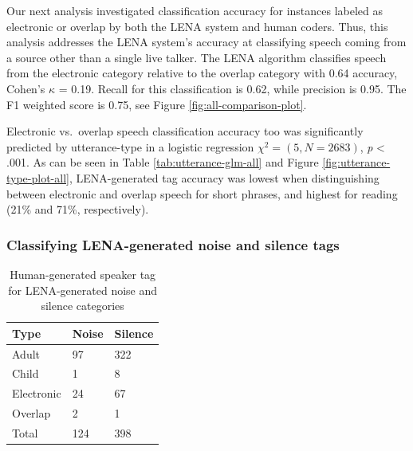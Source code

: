 \documentclass[man,floatsintext]{apa6}
\theoremstyle{definition}
\theoremstyle{definition}
\theoremstyle{definition}
\theoremstyle{remark}
\begin{document}
Our next analysis investigated classification accuracy for instances
labeled as electronic or overlap by both the LENA system and human
coders. Thus, this analysis addresses the LENA system's accuracy at
classifying speech coming from a source other than a single live talker.
The LENA algorithm classifies speech from the electronic category
relative to the overlap category with 0.64 accuracy, Cohen's \(\kappa\)
= 0.19. Recall for this classification is 0.62, while precision is 0.95.
The F1 weighted score is 0.75, see Figure \ref{fig:all-comparison-plot}.

Electronic vs.~overlap speech classification accuracy too was
significantly predicted by utterance-type in a logistic regression
\(\chi^2 = (5, N= 2683)\), \emph{p} \textless{} .001. As can be seen in
Table \ref{tab:utterance-glm-all} and Figure
\ref{fig:utterance-type-plot-all}, LENA-generated tag accuracy was
lowest when distinguishing between electronic and overlap speech for
short phrases, and highest for reading (21\% and 71\%, respectively).

\hypertarget{classifying-lena-generated-noise-and-silence-tags}{%
\subsubsection{Classifying LENA-generated noise and silence
tags}\label{classifying-lena-generated-noise-and-silence-tags}}

\begin{table}[H]
\begin{center}
\begin{threeparttable}
\caption{\label{tab:other-errors}Human-generated speaker tag for LENA-generated noise and silence categories}
\begin{tabular}{lll}
\toprule
Type & \multicolumn{1}{c}{Noise} & \multicolumn{1}{c}{Silence}\\
\midrule
Adult & 97 & 322\\
Child & 1 & 8\\
Electronic & 24 & 67\\
Overlap & 2 & 1\\
Total & 124 & 398\\
\bottomrule
\end{tabular}
\end{threeparttable}
\end{center}
\end{table}
\end{document}
